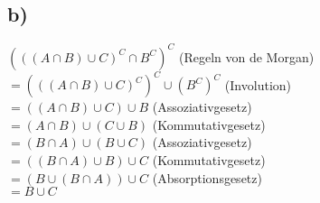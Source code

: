 \documentclass[paper = a4, ngerman]{scrartcl}
\begin{document}
\subsection*{b)}
$(((A\cap B) \cup C)^C \cap B^C)^C$ (Regeln von de Morgan)\\
$= (((A\cap B)\cup C)^C)^C \cup (B^C)^C$ (Involution)\\
$= ((A\cap B)\cup C) \cup B$ (Assoziativgesetz)\\
$= (A\cap B) \cup (C \cup B)$ (Kommutativgesetz)\\
$= (B\cap A) \cup (B \cup C) $ (Assoziativgesetz)\\
$= ((B\cap A)\cup B) \cup C$  (Kommutativgesetz)\\
$= (B\cup (B\cap A))\cup C$ (Absorptionsgesetz)\\
$= B \cup C$
\end{document}
